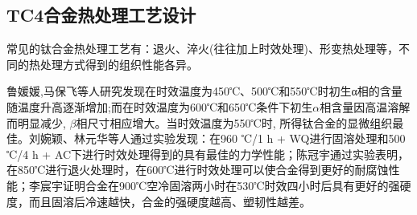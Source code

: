 \subsection{TC4合金热处理工艺设计}
常见的\ti 钛合金热处理工艺有：退火、淬火(往往加上时效处理)、形变热处理等，不同的热处理方式得到的组织性能各异。

鲁媛媛,马保飞等人研究发现在时效温度为450℃、500℃和550℃时初生α相的含量随温度升高逐渐增加;而在时效温度为600℃和650℃条件下初生$\alpha$相含量因高温溶解而明显减少, $\beta$相尺寸相应增大。当时效温度为550℃时, 所得钛合金的显微组织最佳\cite{luyuanyuanShixiaochuliduiTC4taihejinweiguanzuzhihelixuexingnengdeyingxiang2019}。刘婉颖、林元华等人通过实验发现：在960 ℃/1 h + WQ进行固溶处理和500 ℃/4 h + AC下进行时效处理得到的\ti 具有最佳的力学性能\cite{LiuWanYingBuTongReChuLiGongYiDuiTi6Al4VTaiHeJinWeiGuanJieGouHeLiXueXingNengYingXiangYingWen2017}；陈冠宇通过实验表明，在850℃进行退火处理时，在600℃进行时效处理可以使合金得到更好的耐腐蚀性能\cite{1200}；李宸宇证明\ti 合金在900℃空冷固溶两小时在530℃时效四小时后具有更好的强硬度，而且固溶后冷速越快，合金的强硬度越高、塑韧性越差\cite{900}。%

